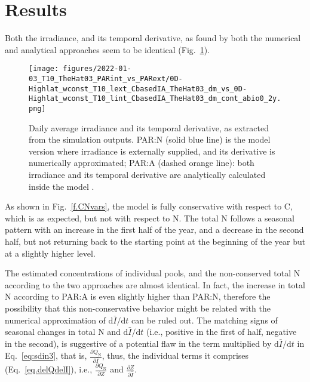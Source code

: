 \documentclass[gmd, manuscript]{copernicus}
\begin{document}





\section{Results}
Both the irradiance, and its temporal derivative, as found by both the numerical and analytical approaches seem to be identical (Fig.~\ref{f.I}).
\begin{figure}[ht!]
\texttt{[image: figures/2022-01-03\_T10\_TheHat03\_PARint\_vs\_PARext/0D-Highlat\_wconst\_T10\_lext\_CbasedIA\_TheHat03\_dm\_vs\_0D-Highlat\_wconst\_T10\_lint\_CbasedIA\_TheHat03\_dm\_cont\_abio0\_2y.png]}
\caption{Daily average irradiance and its temporal derivative, as extracted from the simulation outputs. PAR:N (solid blue line) is the model version where irradiance is externally supplied, and its derivative is numerically approximated; PAR:A (dashed orange line): both irradiance and its temporal derivative are analytically calculated inside the model . \label{f.I}}
\end{figure}

As shown in Fig.~\ref{f.CNvars}, the model is fully conservative with respect to C, which is as expected, but not with respect to N. The total N follows a seasonal pattern with an increase in the first half of the year, and a decrease in the second half, but not returning back to the starting point at the beginning of the year but at a slightly higher level.

The estimated concentrations of individual pools, and the non-conserved total N according to the two approaches are almost identical. In fact, the increase in total N according to  PAR:A is even slightly higher than PAR:N, therefore the possibility that this non-conservative behavior might be related with the numerical approximation of $\text{d}\bar{I}/\text{d}t$  can be ruled out. The matching signs of seasonal changes in total N and $\text{d}\bar{I}/\text{d}t$  (i.e., positive in the first of half, negative in the second), is suggestive of a potential flaw in the term multiplied by $\text{d}\bar{I}/\text{d}t$ in Eq.~\ref{eq:sdin3}, that is,  $\frac{\partial Q_\text{N}}{\partial \bar{I}}$, thus, the individual terms it comprises (Eq.~\ref{eq.delQdelI}), i.e., $\frac{\partial Q_\text{N}}{\partial Z}$ and $\frac{\partial Z}{\partial \bar{I}}$. 
\end{document}
